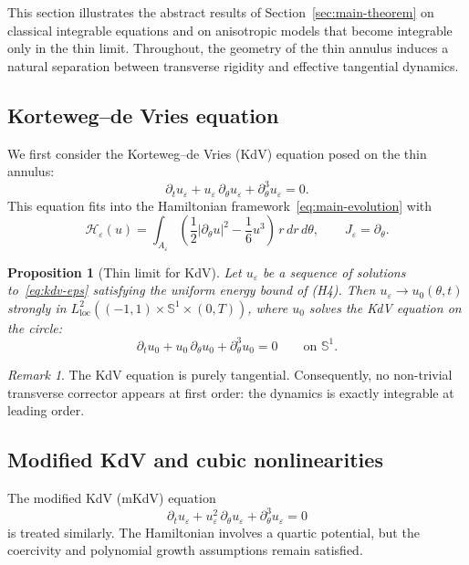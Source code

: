 \documentclass[11pt]{amsart}
\theoremstyle{plain}
\newtheorem{proposition}[theorem]{Proposition}
\theoremstyle{definition}
\theoremstyle{remark}
\newtheorem{remark}[theorem]{Remark}
\theoremstyle{remark}
\begin{document}
This section illustrates the abstract results of
Section~\ref{sec:main-theorem} on classical integrable equations and on
anisotropic models that become integrable only in the thin limit.
Throughout, the geometry of the thin annulus induces a natural separation
between transverse rigidity and effective tangential dynamics.

\subsection{Korteweg--de Vries equation}

We first consider the Korteweg--de Vries (KdV) equation posed on the thin annulus:
\begin{equation}
\label{eq:kdv-eps}
\partial_t u_\varepsilon
+
u_\varepsilon\,\partial_\theta u_\varepsilon
+
\partial_\theta^3 u_\varepsilon
=0.
\end{equation}
This equation fits into the Hamiltonian framework~\eqref{eq:main-evolution} with
\[
\mathcal H_\varepsilon(u)
=
\int_{A_\varepsilon}
\left(
\frac12|\partial_\theta u|^2
-
\frac16 u^3
\right)
\,r\,dr\,d\theta,
\qquad
J_\varepsilon=\partial_\theta.
\]

\begin{proposition}[Thin limit for KdV]
Let $u_\varepsilon$ be a sequence of solutions to~\eqref{eq:kdv-eps} satisfying the
uniform energy bound of {\rm(H4)}.
Then $u_\varepsilon\to u_0(\theta,t)$ strongly in
$L^2_{\mathrm{loc}}((-1,1)\times\mathbb S^1\times(0,T))$, where $u_0$ solves the
KdV equation on the circle:
\[
\partial_t u_0
+
u_0\,\partial_\theta u_0
+
\partial_\theta^3 u_0
=0
\qquad\text{on }\mathbb S^1.
\]
\end{proposition}

\begin{remark}
The KdV equation is purely tangential.
Consequently, no non-trivial transverse corrector appears at first order:
the dynamics is exactly integrable at leading order.
\end{remark}

\subsection{Modified KdV and cubic nonlinearities}

The modified KdV (mKdV) equation
\[
\partial_t u_\varepsilon
+
u_\varepsilon^2\,\partial_\theta u_\varepsilon
+
\partial_\theta^3 u_\varepsilon
=0
\]
is treated similarly.
The Hamiltonian involves a quartic potential, but the coercivity and polynomial
growth assumptions remain satisfied.
\end{document}
